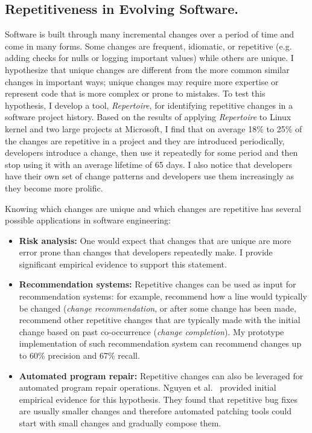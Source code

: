 \documentclass[a4paper, 10pt]{article}
\begin{document}
\begin{small}
\subsection*{\small Repetitiveness in Evolving Software.} Software is built through many incremental changes over a period of time
and come in many forms. Some changes are frequent, idiomatic, or repetitive (e.g. adding checks for nulls 
or logging important values) while others are unique. I hypothesize that unique changes are different from the more common similar 
changes in important ways;  unique changes may require more expertise or represent code that is more complex or prone to mistakes. 
To test this hypothesis, I  develop a tool, {\em Repertoire}, for identifying repetitive changes in a software project history. Based on the 
results of applying {\em Repertoire} to Linux kernel and two large projects at Microsoft, I find that on average 18\% to 25\% of the 
changes are repetitive in a project and they are introduced periodically, \ie developers introduce a change, then use it repeatedly for 
some period and then stop using it with an average lifetime of 65 days. I also notice that developers have their own set of change
patterns and developers use them increasingly as they become more prolific.  

Knowing which changes are unique and which changes are repetitive has several possible applications in software engineering: 
\begin{itemize}
\item \textbf{Risk analysis:} One would expect that changes that are
unique are more error prone than changes that developers repeatedly make. I
provide significant empirical evidence to support this statement. 

\item \textbf{Recommendation systems:} Repetitive changes can be used as input for 
recommendation systems: for example, recommend how a line would typically be changed 
({\em change recommendation}, or after some change has been made, recommend other repetitive changes 
that are typically made with the initial change based on past co-occurrence ({\em change completion}).
My prototype implementation of such recommendation system can recommend changes up to 60\% precision and 
67\% recall.

\item \textbf{Automated program repair:} 
Repetitive changes can also be leveraged for automated program repair operations. Nguyen et al.~\cite{nguyen2013study} 
provided initial empirical evidence for this hypothesis. They found that repetitive bug fixes are 
usually smaller changes and therefore automated patching tools could start with small changes and 
gradually compose them.


\end{itemize}
\end{small}
\end{document}
